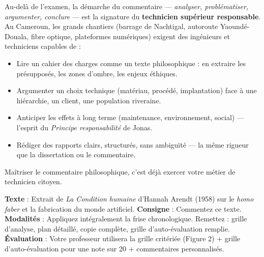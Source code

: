 \documentclass[11pt]{article}
\begin{document}
\begin{savaistu}
Au-delà de l'examen, la démarche du commentaire — \emph{analyser, problématiser, argumenter, conclure} — est la signature du \textbf{technicien supérieur responsable}. Au Cameroun, les grands chantiers (barrage de Nachtigal, autoroute Yaoundé-Douala, fibre optique, plateformes numériques) exigent des ingénieurs et techniciens capables de :
\begin{itemize}
\item Lire un cahier des charges comme un texte philosophique : en extraire les présupposés, les zones d'ombre, les enjeux éthiques.
\item Argumenter un choix technique (matériau, procédé, implantation) face à une hiérarchie, un client, une population riveraine.
\item Anticiper les effets à long terme (maintenance, environnement, social) — l'esprit du \emph{Principe responsabilité} de Jonas.
\item Rédiger des rapports clairs, structurés, sans ambiguïté — la même rigueur que la dissertation ou le commentaire.
\end{itemize}
Maîtriser le commentaire philosophique, c'est déjà exercer votre métier de technicien citoyen.
\end{savaistu}

\begin{exercice}
\textbf{Texte} : Extrait de \emph{La Condition humaine} d'Hannah Arendt (1958) sur le \emph{homo faber} et la fabrication du monde artificiel.
\textbf{Consigne} : Commentez ce texte.
\textbf{Modalités} : Appliquez intégralement la frise chronologique. Remettez : grille d'analyse, plan détaillé, copie complète, grille d'auto-évaluation remplie.
\textbf{Évaluation} : Votre professeur utilisera la grille critériée (Figure 2) + grille d'auto-évaluation pour une note sur 20 + commentaires personnalisés.
\end{exercice}
\end{document}
